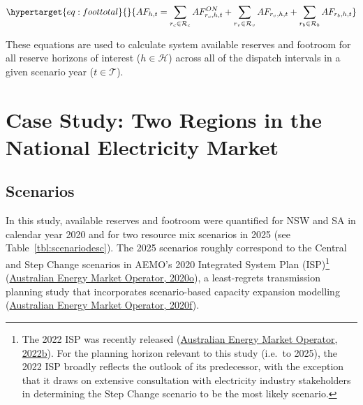 \documentclass[12pt,a4paper,]{report}
\begin{document}
\begin{equation}\protect\hypertarget{eq:foottotal}{}{ AF_{h,t}=\sum_{r_c \in \mathcal{R}_c}{AF_{r_c,h,t}^{ON}} + \sum_{r_v \in \mathcal{R}_v}{AF_{r_v,h,t}} + \sum_{r_b \in \mathcal{R}_b}{AF_{r_b,h,t}} }\label{eq:foottotal}\end{equation}

These equations are used to calculate system available reserves and
footroom for all reserve horizons of interest (\(h \in \mathcal{H}\))
across all of the dispatch intervals in a given scenario year
(\(t \in \mathcal{T}\)).

\hypertarget{sec:reserves-casestudy}{%
\section{Case Study: Two Regions in the National Electricity
Market}\label{sec:reserves-casestudy}}

\hypertarget{scenarios}{%
\subsection{Scenarios}\label{scenarios}}

In this study, available reserves and footroom were quantified for NSW
and SA in calendar year 2020 and for two resource mix scenarios in 2025
(see Table~\ref{tbl:scenariodesc}). The 2025 scenarios roughly
correspond to the Central and Step Change scenarios in AEMO's 2020
Integrated System Plan (ISP)\footnote{The 2022 ISP was recently released
  (\protect\hyperlink{ref-australianenergymarketoperator2022IntegratedSystem2022}{Australian
  Energy Market Operator, 2022b}). For the planning horizon relevant to
  this study (i.e.~to 2025), the 2022 ISP broadly reflects the outlook
  of its predecessor, with the exception that it draws on extensive
  consultation with electricity industry stakeholders in determining the
  Step Change scenario to be the most likely scenario.}
(\protect\hyperlink{ref-australianenergymarketoperator2020ISPGeneration2020}{Australian
Energy Market Operator, 2020o}), a least-regrets transmission planning
study that incorporates scenario-based capacity expansion modelling
(\protect\hyperlink{ref-australianenergymarketoperator2020IntegratedSystem2020}{Australian
Energy Market Operator, 2020f}).
\end{document}
